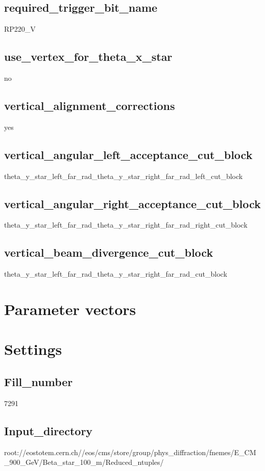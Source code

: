 \documentclass{article}
\begin{document}
\begin{landscape}
\subsection{required\_trigger\_bit\_name}
RP220\_V \newline
\subsection{use\_vertex\_for\_theta\_x\_star}
no \newline
\subsection{vertical\_alignment\_corrections}
yes \newline
\subsection{vertical\_angular\_left\_acceptance\_cut\_block}
theta\_y\_star\_left\_far\_rad\_theta\_y\_star\_right\_far\_rad\_left\_cut\_block \newline
\subsection{vertical\_angular\_right\_acceptance\_cut\_block}
theta\_y\_star\_left\_far\_rad\_theta\_y\_star\_right\_far\_rad\_right\_cut\_block \newline
\subsection{vertical\_beam\_divergence\_cut\_block}
theta\_y\_star\_left\_far\_rad\_theta\_y\_star\_right\_far\_rad\_cut\_block \newline
\section{Parameter vectors}
\section{Settings}
\subsection{Fill\_number}
7291 \newline
\subsection{Input\_directory}
root://eostotem.cern.ch//eos/cms/store/group/phys\_diffraction/fnemes/E\_CM\_900\_GeV/Beta\_star\_100\_m/Reduced\_ntuples/ \newline

\end{landscape}
\end{document}
